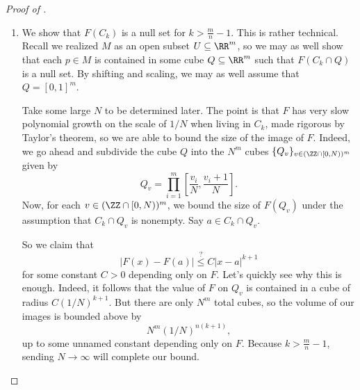 \documentclass[../notes.tex]{subfiles}
\begin{document}
\begin{proof}[Proof of ]
\begin{enumerate}
		In particular, we see that $h^{-1}(\{0\})\cap U_p$ is a lower-dimensional embedded submanifold $S\subseteq M$, and $C_k\cap U_p\subseteq h^{-1}(\{0\})\cap U_p$, so $F(C_k\cap U_p)$ is contained in the critical values of $F|_S\colon S\to N$, which we see has measure zero by the induction. Looping over all $p\in M$ (and then reducing $\{U_p\}_{p\in M}$ to a countable subcover), we conclude.

		\item We show that $F(C_k)$ is a null set for $k>\frac mn-1$. This is rather technical. Recall we realized $M$ as an open subset $U\subseteq\RR^m$, so we may as well show that each $p\in M$ is contained in some cube $Q\subseteq\RR^m$ such that $F(C_k\cap Q)$ is a null set. By shifting and scaling, we may as well assume that $Q=[0,1]^m$.

		Take some large $N$ to be determined later. The point is that $F$ has very slow polynomial growth on the scale of $1/N$ when living in $C_k$, made rigorous by Taylor's theorem, so we are able to bound the size of the image of $F$. Indeed, we go ahead and subdivide the cube $Q$ into the $N^m$ cubes $\{Q_{v}\}_{v\in(\ZZ\cap[0,N))^m}$ given by
		\[Q_{v}=\prod_{i=1}^m\left[\frac{v_i}N,\frac{v_i+1}N\right].\]
		Now, for each $v\in(\ZZ\cap[0,N))^m$, we bound the size of $F(Q_v)$ under the assumption that $C_k\cap Q_v$ is nonempty. Say $a\in C_k\cap Q_v$.

		So we claim that
		\[\left|F(x)-F(a)\right|\stackrel?\le C\left|x-a\right|^{k+1}\]
		for some constant $C>0$ depending only on $F$. Let's quickly see why this is enough. Indeed, it follows that the value of $F$ on $Q_v$ is contained in a cube of radius $C(1/N)^{k+1}$. But there are only $N^m$ total cubes, so the volume of our images is bounded above by
		\[N^m(1/N)^{n(k+1)},\]
		up to some unnamed constant depending only on $F$. Because $k>\frac mn-1$, sending $N\to\infty$ will complete our bound.
		

\end{enumerate}
\end{proof}
\end{document}
